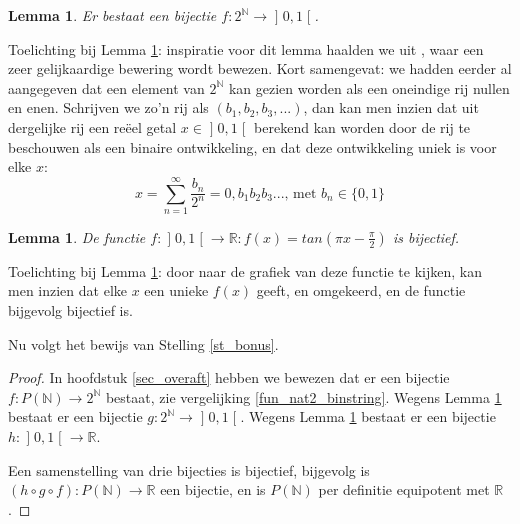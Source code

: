 \documentclass[hidelinks,11pt,a4paper]{article}
\newtheorem{lemma}[stelling]{Lemma}
\begin{document}
\begin{lemma}
\label{lemma_2N_int01} 
Er bestaat een bijectie $f: 2^{\mathbb{N}} \to \mathopen]0,1\mathclose[ $. 
\end{lemma}
Toelichting bij Lemma \ref{lemma_2N_int01}: inspiratie voor dit lemma haalden we uit \cite{youtube_penn}, waar een zeer gelijkaardige bewering wordt bewezen. 
Kort samengevat: we hadden eerder al aangegeven dat een element van $2^{\mathbb{N}}$ kan gezien worden als een oneindige rij nullen en enen. 
Schrijven we zo'n rij als  $(b_1, b_2, b_3, ...)$, dan kan men inzien dat uit dergelijke rij een re\"eel getal $x \in \mathopen]0,1\mathclose[$ berekend kan worden door de rij te beschouwen als een binaire ontwikkeling, en dat deze ontwikkeling uniek is voor elke $x$: 
\[ 
x = \sum_{n=1}^{\infty}{\frac{b_n}{2^n}} = 0,b_1 b_2 b_3 ...  \text{, met } b_n \in \{0,1\} 
\] 

\begin{lemma}
\label{lemma_int01_R} 
De functie $f: \mathopen]0,1\mathclose[ \to \mathbb{R} : f(x) = tan(\pi x - \frac{\pi}{2})$ is bijectief. 
\end{lemma}
Toelichting bij Lemma \ref{lemma_int01_R}: door naar de grafiek van deze functie te kijken, kan men inzien dat elke $x$ een unieke $f(x)$ geeft, en omgekeerd, en de functie bijgevolg bijectief is. 

Nu volgt het bewijs van Stelling \ref{st_bonus}. 
\begin{proof}
In hoofdstuk \ref{sec_overaft} hebben we bewezen dat er een bijectie $f: P(\mathbb{N}) \to  2^{\mathbb{N}}$ bestaat, zie vergelijking \eqref{fun_nat2_binstring}. 
Wegens Lemma \ref{lemma_2N_int01} bestaat er een bijectie 
$g: 2^{\mathbb{N}} \to \mathopen]0,1\mathclose[ $. 
Wegens Lemma \ref{lemma_int01_R} bestaat er een bijectie 
$h: \mathopen]0,1\mathclose[ \to \mathbb{R}$. 

Een samenstelling van drie bijecties is bijectief, bijgevolg is $(h \circ g \circ f): P(\mathbb{N}) \to  \mathbb{R}  $ een bijectie, en is $P(\mathbb{N})$ 
per definitie equipotent met $\mathbb{R}$ . 
\end{proof}
\end{document}
